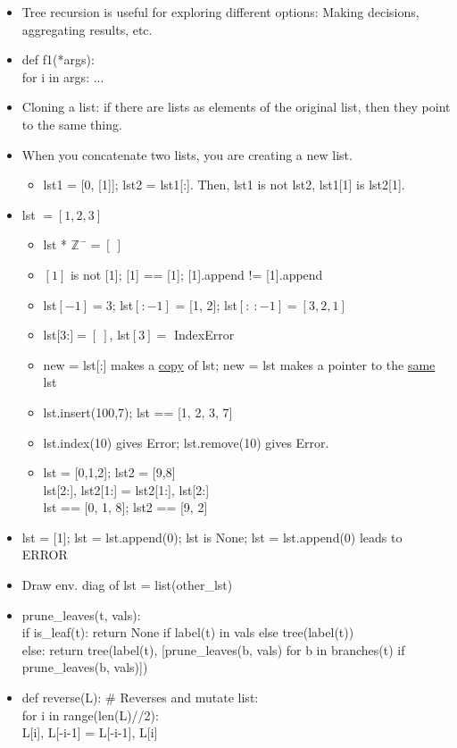 \documentclass{article}
\begin{document}
\begin{itemize}
	\item Tree recursion is useful for exploring different options: Making decisions, aggregating results, etc.
	\item def f1(*args): \\
	for i in args: ...
\end{itemize}

\begin{itemize}
	\item Cloning a list: if there are lists as elements of the original list, then they point to the same thing.
	\item When you concatenate two lists, you are creating a new list.
	\begin{itemize}
		\item lst1 = [0, [1]]; lst2 = lst1[:]. Then, lst1 is not lst2, lst1[1] is lst2[1].
	\end{itemize}
	\item lst $= [1, 2, 3]$
	\begin{itemize}
		\item lst * $\mathbb{Z^-} = [\ ]$
		\item $[1]$ is not [1]; [1] == [1]; [1].append != [1].append
		\item lst$[-1] = 3$; lst$[:-1]$ = [1, 2]; lst$[:\ :-1] = [3, 2, 1]$
		\item lst$[3$:$] = [\ ]$, lst$[3] =$ IndexError
		\item new = lst[:] makes a \ul{copy} of lst; new = lst makes a pointer to the \ul{same} lst
		\item lst.insert(100,7); lst == [1, 2, 3, 7]
		\item lst.index(10) gives Error; lst.remove(10) gives Error.
		\item lst = [0,1,2]; lst2 = [9,8] \\
		lst[2:], lst2[1:] = lst2[1:], lst[2:] \\
		lst == [0, 1, 8]; lst2 == [9, 2]
	\end{itemize}
	\item lst = [1]; lst = lst.append(0); lst is None; lst = lst.append(0) leads to ERROR
	\item Draw env. diag of lst = list(other\_lst)
	\item prune\_leaves(t, vals): \\
	if is\_leaf(t):
        return None if label(t) in vals else tree(label(t)) \\
    else: return tree(label(t), [prune\_leaves(b, vals) for b in branches(t) if prune\_leaves(b, vals)])
    \item def reverse(L): \# Reverses and mutate list: \\
    for i in range(len(L)//2): \\
    L[i], L[-i-1] = L[-i-1], L[i]
\end{itemize}
\end{document}
